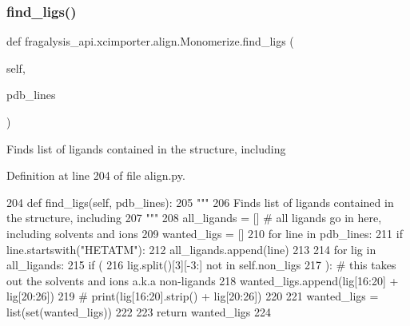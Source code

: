 \subsubsection{\texorpdfstring{find\+\_\+ligs()}{find\_ligs()}}
{\footnotesize\ttfamily def fragalysis\+\_\+api.\+xcimporter.\+align.\+Monomerize.\+find\+\_\+ligs (\begin{DoxyParamCaption}\item[{}]{self,  }\item[{}]{pdb\+\_\+lines }\end{DoxyParamCaption})}

\begin{DoxyVerb}Finds list of ligands contained in the structure, including
\end{DoxyVerb}
 

Definition at line 204 of file align.\+py.


\begin{DoxyCode}
204     \textcolor{keyword}{def }find\_ligs(self, pdb\_lines):
205         \textcolor{stringliteral}{"""}
206 \textcolor{stringliteral}{        Finds list of ligands contained in the structure, including}
207 \textcolor{stringliteral}{        """}
208         all\_ligands = []  \textcolor{comment}{# all ligands go in here, including solvents and ions}
209         wanted\_ligs = []
210         \textcolor{keywordflow}{for} line \textcolor{keywordflow}{in} pdb\_lines:
211             \textcolor{keywordflow}{if} line.startswith(\textcolor{stringliteral}{"HETATM"}):
212                 all\_ligands.append(line)
213 
214         \textcolor{keywordflow}{for} lig \textcolor{keywordflow}{in} all\_ligands:
215             \textcolor{keywordflow}{if} (
216                     lig.split()[3][-3:] \textcolor{keywordflow}{not} \textcolor{keywordflow}{in} self.non\_ligs
217             ):  \textcolor{comment}{# this takes out the solvents and ions a.k.a non-ligands}
218                 wanted\_ligs.append(lig[16:20] + lig[20:26])
219                 \textcolor{comment}{# print(lig[16:20].strip() + lig[20:26])}
220 
221         wanted\_ligs = list(set(wanted\_ligs))
222 
223         \textcolor{keywordflow}{return} wanted\_ligs
224 
\end{DoxyCode}
\mbox{\label{classfragalysis__api_1_1xcimporter_1_1align_1_1_monomerize_ae400c1aa47fa3a5fe32a3ade3f601582}} 
